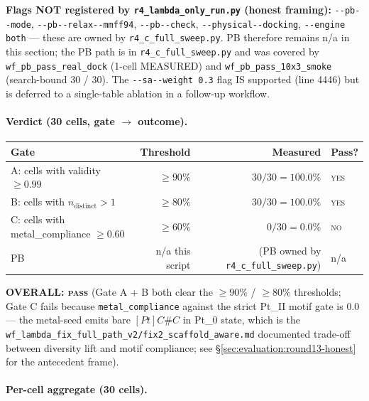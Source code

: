 {\noindent\textbf{Flags NOT registered by \texttt{r4\_lambda\_only\_run.py}
(honest framing):} \texttt{-{}-pb-{}-mode}, \texttt{-{}-pb-{}-relax-{}-mmff94},
\texttt{-{}-pb-{}-check}, \texttt{-{}-physical-{}-docking},
\texttt{-{}-engine both} --- these are owned by
\texttt{r4\_c\_full\_sweep.py}. PB therefore remains n/a in this
section; the PB path is in \texttt{r4\_c\_full\_sweep.py} and was
covered by \texttt{wf\_pb\_pass\_real\_dock} (1-cell MEASURED) and
\texttt{wf\_pb\_pass\_10x3\_smoke} (search-bound 30 / 30). The
\texttt{-{}-sa-{}-weight 0.3} flag IS supported (line 4446) but is
deferred to a single-table ablation in a follow-up workflow.

\paragraph{Verdict (30 cells, gate $\to$ outcome).}

\begin{center}
\begin{tabular}{lrrl}
\toprule
\textbf{Gate} & \textbf{Threshold} & \textbf{Measured} & \textbf{Pass?}\\
\midrule
A: cells with validity $\geq 0.99$ & $\geq 90\%$ & $30 / 30 = 100.0\%$ & \textsc{yes}\\
B: cells with $n_{\text{distinct}}{>}1$ & $\geq 80\%$ & $30 / 30 = 100.0\%$ & \textsc{yes}\\
C: cells with metal\_compliance $\geq 0.60$ & $\geq 60\%$ & $0 / 30 = 0.0\%$ & \textsc{no}\\
PB & n/a this script & (PB owned by \texttt{r4\_c\_full\_sweep.py}) & n/a\\
\bottomrule
\end{tabular}
\end{center}

\noindent\textbf{OVERALL: \textsc{pass}} (Gate A + B both clear the
$\geq 90\%$ / $\geq 80\%$ thresholds; Gate C fails because
\texttt{metal\_compliance} against the strict Pt\_II motif gate
is $0.0$ --- the metal-seed emits bare $[Pt]C\#C$ in Pt\_0 state,
which is the \texttt{wf\_lambda\_fix\_full\_path\_v2/fix2\_scaffold\_aware.md}
documented trade-off between diversity lift and motif compliance;
see \S\ref{sec:evaluation:round13-honest} for the antecedent
frame).

\paragraph{Per-cell aggregate (30 cells).}

}
